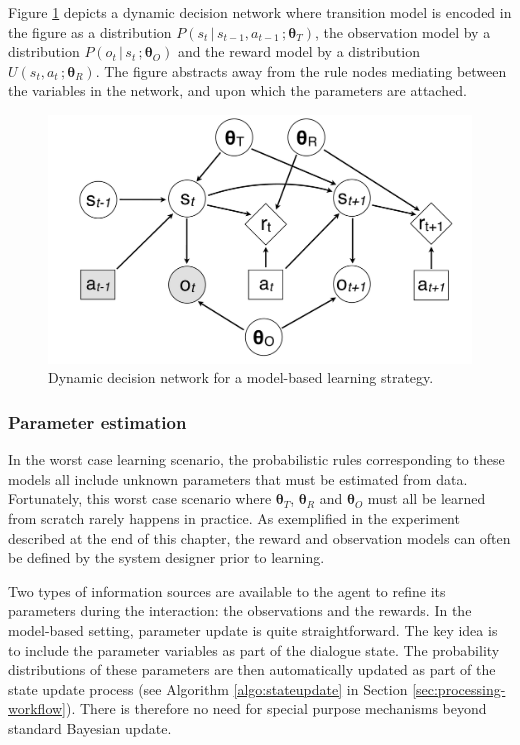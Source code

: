 Figure \ref{fig:modelbasediagram} depicts a dynamic decision network where transition model is encoded in the figure as a distribution $P(s_t \, | \, s_{t-1}, a_{t-1} \,; \boldsymbol\theta_T)$, the observation model by a distribution $P(o_t \, | \, s_t\,; \boldsymbol\theta_O)$ and the reward model by a distribution $U(s_t,a_t\,; \boldsymbol\theta_R)$.  The figure abstracts away from the rule nodes mediating between the variables in the network, and upon which the parameters are attached.

\begin{figure}[h]
\centering
\includegraphics[scale=0.25]{imgs/modelbaseddiagram.pdf}
\caption{Dynamic decision network for a model-based learning strategy.}
\label{fig:modelbasediagram}
\end{figure}

\subsubsection*{Parameter estimation}

In the worst case learning scenario, the probabilistic rules corresponding to these models all include unknown parameters that must be estimated from data.  Fortunately, this worst case scenario where $\boldsymbol\theta_T$, $\boldsymbol\theta_R$ and $\boldsymbol\theta_O$ must all be learned from scratch rarely happens in practice. As exemplified in the experiment described at the end of this chapter, the reward and observation models can often be defined by the system designer prior to learning. 

Two types of information sources are available to the agent to refine its parameters during the interaction: the observations and the rewards.  In the model-based setting, parameter update is quite straightforward.  The key idea is to include the parameter variables as part of the dialogue state.  The probability distributions of these parameters are then automatically updated as part of the state update process (see Algorithm \ref{algo:stateupdate} in Section \ref{sec:processing-workflow}). There is therefore no need for special purpose mechanisms beyond standard Bayesian update.

